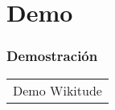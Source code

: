 \section{Demo}
\frame
{
\frametitle{Demostración}
{\setlength{\arrayrulewidth}{0mm}
\begin{table}[ht]
  \centering
  \begin{tabular}{c}
  Demo Wikitude
  \end{tabular}
\end{table}
}
}
